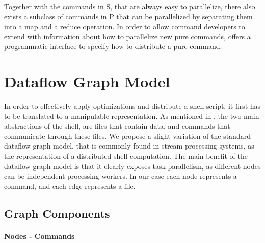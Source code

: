 \documentclass[sigplan,10pt,review,anonymous]{acmart}
\newcommand{\heading}[1]{\vspace{4pt}\noindent\textbf{#1}\enspace}
\newcommand{\cn}[1]{\mbox{\textcircled{\footnotesize #1}}}
\newcommand{\pur}{\cn{\textsc{P}}\xspace}
\newcommand{\sta}{\cn{\textsc{S}}\xspace}
\newcommand{\nv}[1]{[{\color{cyan}#1 --- nv}]}
\newcommand{\tr}[1]{} %
\begin{document}
%
\noindent
Together with the commands in \sta, that are always easy to
parallelize, there also exists a subclass of commands in \pur that can
be parallelized by separating them into a map and a reduce
operation. In order to allow command developers to extend \sys with
information about how to parallelize new pure commands, \sys offers a
programmatic interface to specify how to distribute a pure command.


\tr{I am not sure a general interface is so easy to design. It needs
  more though. It might be beneficial to just talk about sort and wc
  here and how we implemented them and nothing more. Or maybe this
  could then go to the implementation? Or maybe say that one can write
  a python function that given a node of the graph, transforms it into
  many. I am not sure what is best...}


\tr{Can we find a solution for the commands in coreutils?}


\section{Dataflow Graph Model}
\label{ir}

In order to effectively apply optimizations and distribute a shell
script, it first has to be translated to a manipulable
representation. As mentioned in , the two main
abstractions of the shell, are files that contain data, and commands
that communicate through these files. We propose a slight variation of
the standard dataflow graph model, that is commonly found in stream
processing systems, as the representation of a distributed shell
computation. The main benefit of the dataflow graph model is that it
clearly exposes task parallelism, as different nodes can be
independent processing workers. In our case each node represents a
command, and each edge represents a file.

\subsection{Graph Components}

\paragraph{Nodes - Commands}
\end{document}
